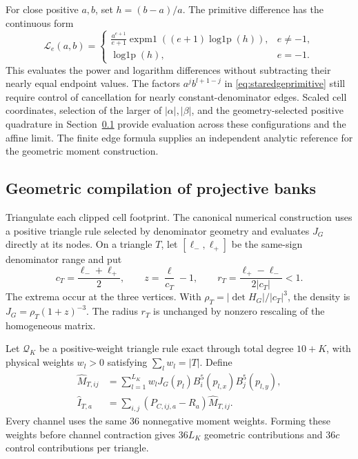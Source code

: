 For close positive $a,b$, set $h=(b-a)/a$. The primitive difference has the
continuous form
\begin{equation}
 \mathcal L_e(a,b)=
 \begin{cases}
 \displaystyle\frac{a^{e+1}}{e+1}
 \operatorname{expm1}((e+1)\operatorname{log1p}(h)),&e\ne-1,\\
 \operatorname{log1p}(h),&e=-1.
 \end{cases}
\end{equation}
This evaluates the power and logarithm differences without subtracting their
nearly equal endpoint values. The factors $a^j b^{l+1-j}$ in
\eqref{eq:staredgeprimitive} still require control of cancellation for nearly
constant-denominator edges. Scaled cell coordinates, selection of the larger
of $|\alpha|,|\beta|$, and the geometry-selected positive quadrature in
Section~\ref{sec:stargeometric} provide evaluation across these
configurations and the affine limit. The finite edge formula supplies an
independent analytic reference for the geometric moment construction.

\subsection{Geometric compilation of projective banks}
\label{sec:stargeometric}
Triangulate each clipped cell footprint. The canonical numerical construction
uses a positive triangle rule selected by denominator geometry and evaluates
$J_G$ directly at its nodes. On a triangle $T$, let
$[\ell_-,\ell_+]$ be the same-sign denominator range and put
\begin{equation}
 c_T=\frac{\ell_-+\ell_+}{2},\qquad
 z=\frac{\ell}{c_T}-1,\qquad
 r_T=\frac{\ell_+-\ell_-}{2|c_T|}<1.
 \label{eq:stargeometricradius}
\end{equation}
The extrema occur at the three vertices. With
$\rho_T=|\det H_G|/|c_T|^3$, the density is
$J_G=\rho_T(1+z)^{-3}$. The radius $r_T$ is unchanged by nonzero rescaling
of the homogeneous matrix.

Let $\mathcal Q_K$ be a positive-weight triangle rule exact through total
degree $10+K$, with physical weights $w_l>0$ satisfying
$\sum_lw_l=|T|$. Define
\begin{align}
 \widehat M_{T,ij}
 &=\sum_{l=1}^{L_K}w_lJ_G(p_l)
 B_i^5(p_{l,x})B_j^5(p_{l,y}),\nonumber\\
 \widehat I_{T,a}
 &=\sum_{i,j}(P_{C,ij,a}-R_a)\widehat M_{T,ij}.
 \label{eq:starintegratedpolyphase}
\end{align}
Every channel uses the same 36 nonnegative moment weights. Forming these
weights before channel contraction gives $36L_K$ geometric contributions
and $36c$ control contributions per triangle.

